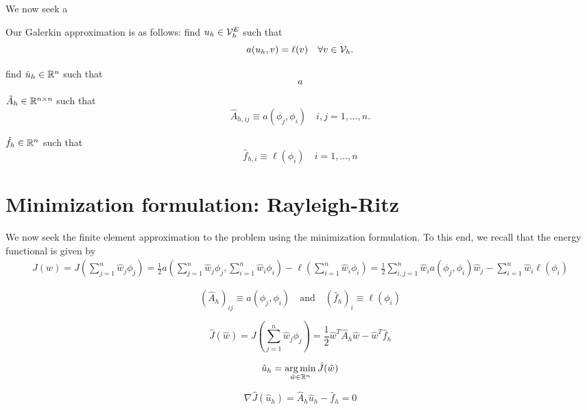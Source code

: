 We now seek a

Our Galerkin approximation is as follows: find $u_h \in \mathcal{V}_h^E$ such that
\begin{equation*}
  a(u_h,v) = \ell(v) \quad \forall v \in \mathcal{V}_h.
\end{equation*}

find $\hat u_h \in \mathbb{R}^n$ such that
\begin{equation*}
  a
\end{equation*}

$\hat A_h \in \mathbb{R}^{n \times n}$ such that 
\begin{equation*}
  \hat A_{h,ij} \equiv a(\phi_j, \phi_i) \quad i,j = 1,\dots,n.
\end{equation*}

$\hat f_h \in \mathbb{R}^n$ such that
\begin{equation*}
  \hat f_{h,i} \equiv \ell(\phi_i) \quad i = 1,\dots,n
\end{equation*}

\section{Minimization formulation: Rayleigh-Ritz}
We now seek the finite element approximation to the problem using the minimization formulation. To this end, we recall that the energy functional is given by 
\begin{align*}
  J(w) =  J(\sum_{j=1}^n \hat w_j \phi_j)
  = \frac{1}{2} a (\sum_{j=1}^n \hat w_j \phi_j, \sum_{i=1}^n \hat w_i \phi_i) - \ell(\sum_{i=1}^n \hat w_i \phi_i)
  = \frac{1}{2} \sum_{i,j=1}^n \hat w_i a(\phi_j,\phi_i) \hat w_j - \sum_{i=1}^n \hat w_i \ell(\phi_i)
\end{align*}

\begin{equation*}
  (\hat A_h)_{ij} \equiv a(\phi_j,\phi_i)
  \quad \text{and} \quad
  (\hat f_h)_i \equiv \ell(\phi_i)
\end{equation*}

\begin{equation*}
  \hat J(\hat w) = J(\sum_{j=1}^n \hat w_j \phi_j)
  = \frac{1}{2} \hat w^T \hat A_h \hat w - \hat w^T \hat f_h
\end{equation*}

\begin{equation*}
  \hat u_h = \operatorname*{arg\,min}_{\hat w \in \mathbb{R}^n} \hat J(\hat w)
\end{equation*}

\begin{equation*}
  \nabla \hat J(\hat u_h) = \hat A_h \hat u_h - \hat f_h = 0
\end{equation*}

